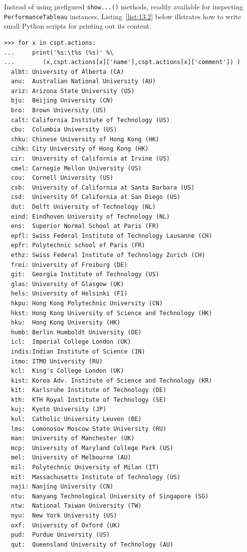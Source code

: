 Instead of using prefigured \Digraph \texttt{show...()} methods, readily available for inspecting \texttt{PerformanceTableau} instances, Listing~\vref{list:13.2} below illstrates how to write small Python scripts for printing out its content.   
\begin{lstlisting}[caption={Printing the CS Departments},label=list:13.2,basicstyle=\ttfamily\scriptsize]
>>> for x in cspt.actions:
...     print('%s:\t%s (%s)' %\
...        (x,cspt.actions[x]['name'],cspt.actions[x]['comment']) )
  albt:	University of Alberta (CA)
  anu:	Australian National University (AU)
  ariz:	Arizona State University (US)
  bju:	Beijing University (CN)
  bro:	Brown University (US)
  calt:	California Institute of Technology (US)
  cbu:	Columbia University (US)
  chku:	Chinese University of Hong Kong (HK)
  cihk:	City University of Hong Kong (HK)
  cir:	University of California at Irvine (US)
  cmel:	Carnegie Mellon University (US)
  cou:	Cornell University (US)
  csb:	University of California at Santa Barbara (US)
  csd:	University Of California at San Diego (US)
  dut:	Delft University of Technology (NL)
  eind:	Eindhoven University of Technology (NL)
  ens:	Superior Normal School at Paris (FR)
  epfl:	Swiss Federal Institute of Technology Lausanne (CH)
  epfr:	Polytechnic school of Paris (FR)
  ethz:	Swiss Federal Institute of Technology Zurich (CH)
  frei:	University of Freiburg (DE)
  git:	Georgia Institute of Technology (US)
  glas:	University of Glasgow (UK)
  hels:	University of Helsinki (FI)
  hkpu:	Hong Kong Polytechnic University (CN)
  hkst:	Hong Kong University of Science and Technology (HK)
  hku:	Hong Kong University (HK)
  humb:	Berlin Humboldt University (DE)
  icl:	Imperial College London (UK)
  indis:Indian Institute of Science (IN)
  itmo:	ITMO University (RU)
  kcl:	King's College London (UK)
  kist:	Korea Adv. Institute of Science and Technology (KR)
  kit:	Karlsruhe Institute of Technology (DE)
  kth:	KTH Royal Institute of Technology (SE)
  kuj:	Kyoto University (JP)
  kul:	Catholic University Leuven (BE)
  lms:	Lomonosov Moscow State University (RU)
  man:	University of Manchester (UK)
  mcp:	University of Maryland College Park (US)
  mel:	University of Melbourne (AU)
  mil:	Polytechnic University of Milan (IT)
  mit:	Massachusetts Institute of Technology (US)
  naji:	Nanjing University (CN)
  ntu:	Nanyang Technological University of Singapore (SG)
  ntw:	National Taiwan University (TW)
  nyu:	New York University (US)
  oxf:	University of Oxford (UK)
  pud:	Purdue University (US)
  qut:	Queensland University of Technology (AU)

\end{lstlisting}
